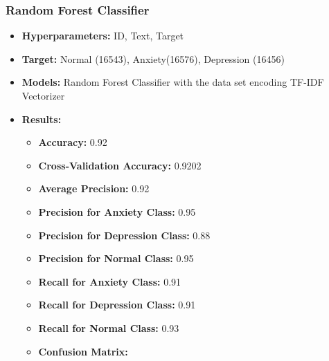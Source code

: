 \documentclass[runningheads,a4paper,11pt]{report}
\begin{document}
\subsubsection{Random Forest Classifier}
\label{section:randomForestClassifier}
\begin{itemize}
    \item \textbf{Hyperparameters:} ID, Text, Target
    \item \textbf{Target:} Normal (16543), Anxiety(16576), Depression (16456)
    \item \textbf{Models:} Random Forest Classifier with the data set encoding TF-IDF Vectorizer
    \item \textbf{Results:}
    \begin{itemize}
        \item \textbf{Accuracy:} 0.92 
        \item \textbf{Cross-Validation Accuracy:} 0.9202
        \item \textbf{Average Precision:} 0.92
        \item \textbf{Precision for Anxiety Class:} 0.95
        \item \textbf{Precision for Depression Class:} 0.88
        \item \textbf{Precision for Normal Class:} 0.95
        \item \textbf{Recall for Anxiety Class:} 0.91
        \item \textbf{Recall for Depression Class:} 0.91
        \item \textbf{Recall for Normal Class:} 0.93
        \item \textbf{Confusion Matrix:}
    \end{itemize}
\end{itemize}
\end{document}
